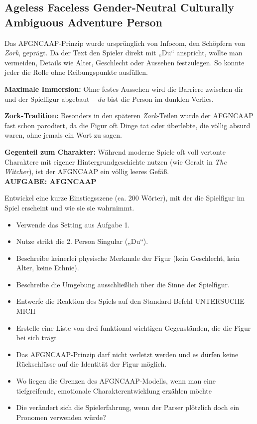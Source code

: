 \documentclass[parskip=half,a4paper,11pt]{scrreprt}
\begin{document}
\subsection{Ageless Faceless Gender-Neutral Culturally Ambiguous Adventure Person}

Das AFGNCAAP-Prinzip wurde ursprünglich von Infocom, den Schöpfern von \textit{Zork}, geprägt. Da der Text den Spieler direkt mit „Du“ anspricht, wollte man vermeiden, Details wie Alter, Geschlecht oder Aussehen festzulegen. So konnte jeder die Rolle ohne Reibungspunkte ausfüllen.

\textbf{Maximale Immersion:} Ohne festes Aussehen wird die Barriere zwischen dir und der Spielfigur abgebaut – \textit{du} bist die Person im dunklen Verlies.

\textbf{Zork-Tradition:} Besonders in den späteren \textit{Zork}-Teilen wurde der AFGNCAAP fast schon parodiert, da die Figur oft Dinge tat oder überlebte, die völlig absurd waren, ohne jemals ein Wort zu sagen.

\textbf{Gegenteil zum Charakter:} Während moderne Spiele oft voll vertonte Charaktere mit eigener Hintergrundgeschichte nutzen (wie Geralt in \textit{The Witcher}), ist der AFGNCAAP ein völlig leeres Gefäß.\\

\textbf{AUFGABE: AFGNCAAP}

Entwickel eine kurze Einstiegsszene (ca. 200 Wörter), mit der die Spielfigur im Spiel erscheint und wie sie sie wahrnimmt. 

\begin{itemize}
    \item Verwende das Setting aus Aufgabe 1.
    \item Nutze strikt die 2. Person Singular („Du“).
    \item Beschreibe keinerlei physische Merkmale der Figur (kein Geschlecht, kein Alter, keine Ethnie).
    \item Beschreibe die Umgebung ausschließlich über die Sinne der Spielfigur.
    \item Entwerfe die Reaktion des Spiels auf den Standard-Befehl UNTERSUCHE MICH 
    \item Erstelle eine Liste von drei funktional wichtigen Gegenständen, die die Figur bei sich trägt
    \item Das AFGNCAAP-Prinzip darf nicht verletzt werden und es dürfen keine Rückschlüsse auf die Identität der Figur möglich.
    \item Wo liegen die Grenzen des AFGNCAAP-Modells, wenn man eine tiefgreifende, emotionale Charakterentwicklung erzählen möchte
    \item Die verändert sich die Spielerfahrung, wenn der Parser plötzlich doch ein Pronomen verwenden würde?
\end{itemize}
\end{document}
